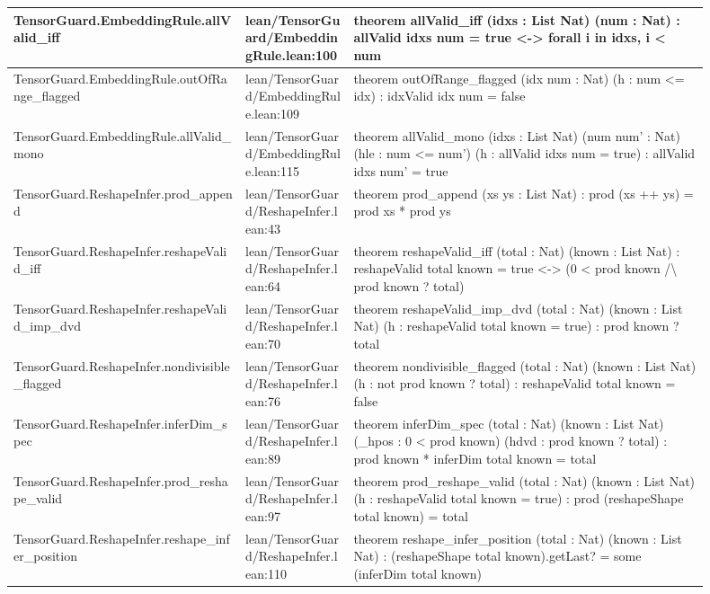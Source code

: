 \documentclass[10pt]{article}
\begin{document}
\begin{longtable}{|p{0.30\linewidth}|p{0.14\linewidth}|p{0.46\linewidth}|}
\hline
TensorGuard.EmbeddingRule.allValid\_iff & lean/TensorGuard/EmbeddingRule.lean:100 & theorem allValid\_iff (idxs : List Nat) (num : Nat) : allValid idxs num = true <-> forall i in idxs, i < num \\
\hline
TensorGuard.EmbeddingRule.outOfRange\_flagged & lean/TensorGuard/EmbeddingRule.lean:109 & theorem outOfRange\_flagged (idx num : Nat) (h : num <= idx) : idxValid idx num = false \\
\hline
TensorGuard.EmbeddingRule.allValid\_mono & lean/TensorGuard/EmbeddingRule.lean:115 & theorem allValid\_mono (idxs : List Nat) (num num' : Nat) (hle : num <= num') (h : allValid idxs num = true) : allValid idxs num' = true \\
\hline
TensorGuard.ReshapeInfer.prod\_append & lean/TensorGuard/ReshapeInfer.lean:43 & theorem prod\_append (xs ys : List Nat) : prod (xs ++ ys) = prod xs * prod ys \\
\hline
TensorGuard.ReshapeInfer.reshapeValid\_iff & lean/TensorGuard/ReshapeInfer.lean:64 & theorem reshapeValid\_iff (total : Nat) (known : List Nat) : reshapeValid total known = true <-> (0 < prod known /\textbackslash{} prod known ? total) \\
\hline
TensorGuard.ReshapeInfer.reshapeValid\_imp\_dvd & lean/TensorGuard/ReshapeInfer.lean:70 & theorem reshapeValid\_imp\_dvd (total : Nat) (known : List Nat) (h : reshapeValid total known = true) : prod known ? total \\
\hline
TensorGuard.ReshapeInfer.nondivisible\_flagged & lean/TensorGuard/ReshapeInfer.lean:76 & theorem nondivisible\_flagged (total : Nat) (known : List Nat) (h : not  prod known ? total) : reshapeValid total known = false \\
\hline
TensorGuard.ReshapeInfer.inferDim\_spec & lean/TensorGuard/ReshapeInfer.lean:89 & theorem inferDim\_spec (total : Nat) (known : List Nat) (\_hpos : 0 < prod known) (hdvd : prod known ? total) : prod known * inferDim total known = total \\
\hline
TensorGuard.ReshapeInfer.prod\_reshape\_valid & lean/TensorGuard/ReshapeInfer.lean:97 & theorem prod\_reshape\_valid (total : Nat) (known : List Nat) (h : reshapeValid total known = true) : prod (reshapeShape total known) = total \\
\hline
TensorGuard.ReshapeInfer.reshape\_infer\_position & lean/TensorGuard/ReshapeInfer.lean:110 & theorem reshape\_infer\_position (total : Nat) (known : List Nat) : (reshapeShape total known).getLast? = some (inferDim total known) \\

\end{longtable}
\end{document}

